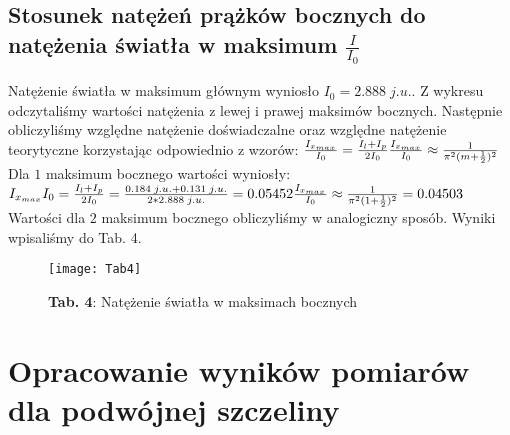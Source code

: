 \documentclass[12pt]{article}
\begin{document}
\subsection{Stosunek natężeń prążków bocznych do natężenia światła w maksimum $\frac{I}{I_0}$}
Natężenie światła w maksimum głównym wyniosło $I_0=2.888\;j. u.$. Z wykresu odczytaliśmy wartości natężenia z lewej i prawej maksimów bocznych. Następnie obliczyliśmy względne natężenie doświadczalne oraz względne natężenie teorytyczne korzystając odpowiednio z wzorów: \newline \newline
{\Large $\frac{I_{x_{max}}}{I_0}=\frac{I_l+I_p}{2I_0} \newline 
\frac{I_{x_{max}}}{I_0}\approx\frac{1}{\pi^2(m+\frac{1}{2})^2}$} \newline \newline
Dla $1$ maksimum bocznego wartości wyniosły: \newline \newline
{\Large ${I_{x_{max}}}{I_0}=\frac{I_l+I_p}{2I_0}=\frac{0.184\;j. u.+0.131\;j. u.}{2*2.888\;j. u.}=0.05452 \newline
\frac{I_{x_{max}}}{I_0}\approx\frac{1}{\pi^2(1+\frac{1}{2})^2}=0.04503$} \newline \newline
Wartości dla $2$ maksimum bocznego obliczyliśmy w analogiczny sposób. Wyniki wpisaliśmy do Tab. 4.
\begin{figure}[H]
\centering
\texttt{[image: Tab4]}
\caption*{\textbf{Tab. 4}: Natężenie światła w maksimach bocznych}
\end{figure}
\newpage
\section{Opracowanie wyników pomiarów dla podwójnej szczeliny}
\end{document}
